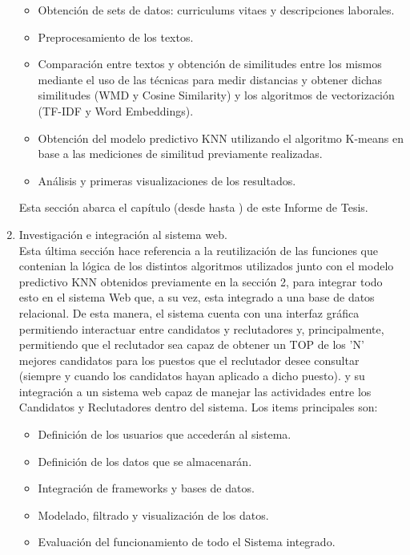 \documentclass[12pt,a4paper]{article}
\begin{document}
\begin{enumerate}
\begin{itemize}
	\item Obtención de sets de datos: curriculums vitaes y descripciones laborales. 
	\item Preprocesamiento de los textos.
	\item Comparación entre textos y obtención de similitudes entre los mismos mediante el uso de las técnicas para medir distancias y obtener dichas similitudes (WMD y Cosine Similarity) y los algoritmos de vectorización (TF-IDF y Word Embeddings).
	\item Obtención del modelo predictivo KNN utilizando el algoritmo K-means en base a las mediciones de similitud previamente realizadas.
	\item Análisis y primeras visualizaciones de los resultados.
\end{itemize} 
 
Esta sección abarca el capítulo \textit{} (desde \textit{} hasta \textit{}) de este Informe de Tesis. \\

\item Investigación e integración al sistema web.\\

Esta última sección hace referencia a la reutilización de las funciones que contenian la lógica de los distintos algoritmos utilizados junto con el modelo predictivo KNN obtenidos previamente en la sección 2, para integrar todo esto en el sistema Web que, a su vez, esta integrado a una base de datos relacional. De esta manera, el sistema cuenta con una interfaz gráfica permitiendo interactuar entre candidatos y reclutadores y, principalmente, permitiendo que el reclutador sea capaz de obtener un TOP de los 'N' mejores candidatos para los puestos que el reclutador desee consultar (siempre y cuando los candidatos hayan aplicado a dicho puesto). 
y su integración a un sistema web capaz de manejar las actividades entre los Candidatos y Reclutadores dentro del sistema. Los items principales son:
\begin{itemize}
	\item Definición de los usuarios que accederán al sistema.
	\item Definición de los datos que se almacenarán.
	\item Integración de frameworks y bases de datos.  
	\item Modelado, filtrado y visualización de los datos.
	\item Evaluación del funcionamiento de todo el Sistema integrado.
\end{itemize} 

\end{enumerate}
\end{document}
